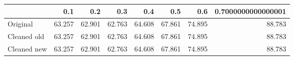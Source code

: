 \begin{tabular}{lrrrrrrr}
\toprule
{} &    0.1 &    0.2 &    0.3 &    0.4 &    0.5 &    0.6 & 0.7000000000000001 \\
\midrule
Original    & 63.257 & 62.901 & 62.763 & 64.608 & 67.861 & 74.895 &             88.783 \\
Cleaned old & 63.257 & 62.901 & 62.763 & 64.608 & 67.861 & 74.895 &             88.783 \\
Cleaned new & 63.257 & 62.901 & 62.763 & 64.608 & 67.861 & 74.895 &             88.783 \\
\bottomrule
\end{tabular}
